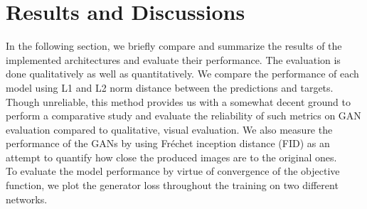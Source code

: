 \documentclass{article} %
\begin{document}
\section{Results and Discussions}
    \hspace*{0.25 in}In the following section, we briefly compare and summarize the results of the implemented architectures and evaluate their performance. The evaluation is done qualitatively as well as quantitatively. We compare the performance of each model using L1 and L2 norm distance between the predictions and targets. Though unreliable, this method provides us with a somewhat decent ground to perform a comparative study and evaluate the reliability of such metrics on GAN evaluation compared to qualitative, visual evaluation. We also measure the performance of the GANs by using Fréchet inception distance (FID) as an attempt to quantify how close the produced images are to the original ones.\\
    \hspace*{0.25 in}To evaluate the model performance by virtue of convergence of the objective function, we plot the generator loss throughout the training on two different networks.\\
\end{document}
